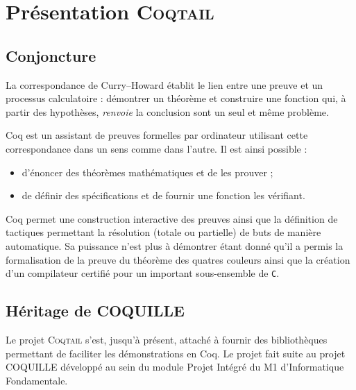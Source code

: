 \documentclass[11pt]{article}
\newcommand{\coqtail}{\textsc{Coqtail}}
\begin{document}


\section{Présentation \coqtail{}}


\subsection{Conjoncture}

La correspondance de Curry--Howard établit le lien entre une preuve et un processus calculatoire : démontrer un théorème et construire une fonction qui, à partir des hypothèses, \emph{renvoie} la conclusion sont un seul et même problème.

Coq\cite{L:BC04} est un assistant de preuves formelles par ordinateur utilisant cette correspondance dans un sens comme dans l'autre. Il est ainsi possible :
\begin{itemize}
  \item d'énoncer des théorèmes mathématiques et de les prouver ;
  \item de définir des spécifications et de fournir une fonction les vérifiant.
\end{itemize}

Coq permet une construction interactive des preuves ainsi que la définition de tactiques permettant la résolution (totale ou partielle) de buts de manière automatique. Sa puissance n'est plus à démontrer étant donné qu'il a permis la formalisation de la preuve du théorème des quatres couleurs\cite{Gonthier07} ainsi que la création d'un compilateur certifié pour un important sous-ensemble de \texttt{C}\cite{compcert}.

\subsection{Héritage de COQUILLE}

Le projet \coqtail{} s'est, jusqu'à présent, attaché à fournir des bibliothèques permettant de faciliter les démonstrations en Coq. Le projet fait suite au projet COQUILLE développé au sein du module Projet Intégré du M1 d'Informatique Fondamentale.
\end{document}
